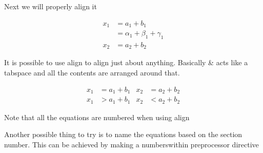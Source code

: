 \documentclass{article}[12pt]
\numberwithin{equation}{section}
\begin{document}
Next we will properly align it


\begin{align}
x_1 & = a_1 + b_1\\
 & = \alpha_1 + \beta_1 + \gamma_1\\
x_2 &  = a_2 + b_2
\end{align}


It is possible to use align to align just about anything. Basically \& acts like a tabspace and all the contents are arranged around that. 


\begin{align}
x_1 & = a_1 + b_1 & x_2 &  = a_2 + b_2 \\
x_1 & > a_1 + b_1 & x_2 &  < a_2 + b_2
\end{align}

Note that all the equations are numbered when using align

Another possible thing to try is to name the equations based on the section number. This can be achieved by making a numberswithin preprocessor directive
\end{document}
